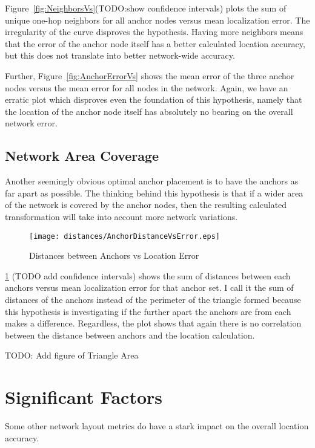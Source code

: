 Figure~\ref{fig:NeighborsVs}(TODO:show confidence intervals) plots the sum of unique one-hop neighbors for all anchor nodes versus mean localization error.  The irregularity of the curve disproves the hypothesis. Having more neighbors means that the error of the anchor node itself has a better calculated location accuracy, but this does not translate into better network-wide accuracy.

Further, Figure~\ref{fig:AnchorErrorVs} shows the mean error of the three anchor nodes versus the mean error for all nodes in the network. Again, we have an erratic plot which disproves even the foundation of this hypothesis, namely that the location of the anchor node itself has absolutely no bearing on the overall network error.

\subsection{Network Area Coverage}

Another seemingly obvious optimal anchor placement is to have the anchors as far apart as possible.  The thinking behind this hypothesis is that if a wider area of the network is covered by the anchor nodes, then the resulting calculated transformation will take into account more network variations.  

\begin{figure}
  \centering
      \texttt{[image: distances/AnchorDistanceVsError.eps]}
    \caption{Distances between Anchors vs Location Error}
    \label{fig:Distances1}
\end{figure}

\ref{fig:Distances1} (TODO add confidence intervals) shows the sum of distances between each anchors versus mean localization error for that anchor set. I call it the sum of distances of the anchors instead of the perimeter of the triangle formed because this hypothesis is investigating if the further apart the anchors are from each makes a difference.  Regardless, the plot shows that again there is no correlation between the distance between anchors and the location calculation.

TODO: Add figure of Triangle Area

\section{Significant Factors}

Some other network layout metrics do have a stark impact on the overall location accuracy.


